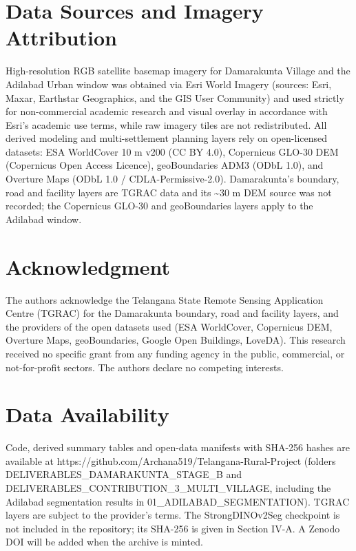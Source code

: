 \documentclass[journal]{IEEEtran}
\begin{document}
\section*{Data Sources and Imagery Attribution}

High-resolution RGB satellite basemap imagery for Damarakunta Village and the Adilabad Urban window was obtained via Esri World Imagery (sources: Esri, Maxar, Earthstar Geographics, and the GIS User Community) and used strictly for non-commercial academic research and visual overlay in accordance with Esri's academic use terms, while raw imagery tiles are not redistributed. All derived modeling and multi-settlement planning layers rely on open-licensed datasets: ESA WorldCover 10 m v200 (CC BY 4.0), Copernicus GLO-30 DEM (Copernicus Open Access Licence), geoBoundaries ADM3 (ODbL 1.0), and Overture Maps (ODbL 1.0 / CDLA-Permissive-2.0). Damarakunta's boundary, road and facility layers are TGRAC data and its \textasciitilde{}30 m DEM source was not recorded; the Copernicus GLO-30 and geoBoundaries layers apply to the Adilabad window.

\section*{Acknowledgment}

The authors acknowledge the Telangana State Remote Sensing Application Centre (TGRAC) for the Damarakunta boundary, road and facility layers, and the providers of the open datasets used (ESA WorldCover, Copernicus DEM, Overture Maps, geoBoundaries, Google Open Buildings, LoveDA). This research received no specific grant from any funding agency in the public, commercial, or not-for-profit sectors. The authors declare no competing interests.

\section*{Data Availability}

Code, derived summary tables and open-data manifests with SHA-256 hashes are available at https://github.com/Archana519/Telangana-Rural-Project (folders DELIVERABLES\_DAMARAKUNTA\_STAGE\_B and DELIVERABLES\_CONTRIBUTION\_3\_MULTI\_VILLAGE, including the Adilabad segmentation results in 01\_ADILABAD\_SEGMENTATION). TGRAC layers are subject to the provider's terms. The StrongDINOv2Seg checkpoint is not included in the repository; its SHA-256 is given in Section IV-A. A Zenodo DOI will be added when the archive is minted.

\IEEEtriggercmd{\enlargethispage{-4.5in}}


\end{document}
